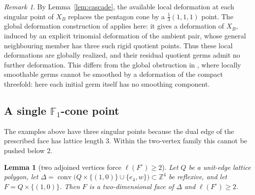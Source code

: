 \documentclass[11pt]{amsart}
\newtheorem{lemma}[theorem]{Lemma}
\theoremstyle{definition}
\theoremstyle{remark}
\newtheorem{remark}[theorem]{Remark}
\newcommand{\ZZ}{\mathbb{Z}}
\newcommand{\conv}{\operatorname{conv}}
\newcommand{\FF}{\mathbb{F}}
\begin{document}
\begin{remark}\label{rem:stuck}
By Lemma~\ref{lem:cascade}, the available local deformation at each singular
point of $X_B$ replaces the pentagon cone by a $\frac13(1,1,1)$ point.  The
global deformation construction of \cite[Proposition~4.7]{paper2} applies here:
it gives a deformation of $X_B$, induced by an explicit trinomial deformation
of the ambient pair, whose general neighbouring member has three such rigid
quotient points.  Thus these local deformations are globally realized,
and their residual quotient germs admit no further deformation.
This differs from the global obstruction in \cite[Example~4.1]{Gross97},
where locally smoothable germs cannot be smoothed by a deformation of the
compact threefold: here each initial germ itself has no smoothing component.
\end{remark}

\subsection{A single \texorpdfstring{$\FF_1$}{F1}-cone point}

The examples above have three singular points because the dual edge of the
prescribed face has lattice length $3$.  Within the two-vertex family this
cannot be pushed below $2$.

\begin{lemma}[two adjoined vertices force $\ell(F^\circ)\ge2$]
\label{lem:twovertices}
Let $Q$ be a unit-edge lattice polygon, let
$\Delta = \conv\bigl(Q\times\{(1,0)\}\cup\{e_4, w\}\bigr) \subset \ZZ^4$ be
reflexive, and let $F = Q\times\{(1,0)\}$.  Then $F$ is a
two-dimensional face of $\Delta$ and $\ell(F^\circ) \ge 2$.
\end{lemma}
\end{document}
